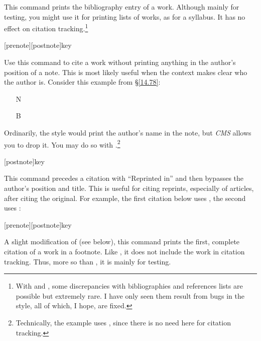\documentclass[11pt,letterpaper,oneside]{article}
\begin{document}
\begin{ltxsyntax}


This command prints the bibliography entry of a work. Although mainly
for testing, you might use it for printing lists of works, as for a
syllabus. It has no effect on citation tracking.\footnote{With
 and , some discrepancies with
bibliographies and references lists are possible but extremely rare. I
have only seen them result from bugs in the style, all of which, I
hope, are fixed.}

[prenote][postnote]{key}

Use this command to cite a work without printing anything in the
author's position of a note. This is most likely useful when the
context makes clear who the author is. Consider this example from
\S\ref{14.78}:

\begin{itemize}
\item[N] 

\item[B] 
\end{itemize}

\noindent Ordinarily, the style would print the author's name in the
note, but \textit{CMS} allows you to drop it. You may do so with
.\footnote{Technically, the example uses ,
since there is no need here for citation tracking.}

[postnote]{key}

This command precedes a citation with ``Reprinted in'' and then
bypasses the author's position and title. This is useful for citing
reprints, especially of articles, after citing the original. For
example, the first citation below uses , the second uses
:

\begin{itemize}
\item[] \cite{frankfurt1969} 
\end{itemize}

[prenote][postnote]{key}

A slight modification of  (see below), this command
prints the first, complete citation of a work in a footnote. Like
, it does not include the work in citation tracking.
Thus, more so than , it is mainly for testing.


\end{ltxsyntax}
\end{document}
